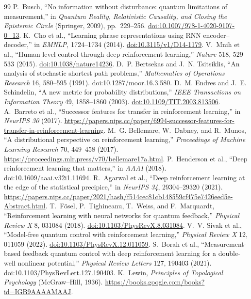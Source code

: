 \documentclass[11pt]{article}
\newcommand{\doi}[1]{\href{https://doi.org/#1}{doi:#1}}
\begin{document}
\begin{thebibliography}{99}
 P.~Busch,
``No information without disturbance: quantum limitations of measurement,''
in \emph{Quantum Reality, Relativistic Causality, and Closing the Epistemic
Circle} (Springer, 2009), pp.~229--256.
\doi{10.1007/978-1-4020-9107-0\_13}.
 K.~Cho et al., “Learning phrase representations using RNN
encoder--decoder,” in \emph{EMNLP}, 1724--1734 (2014).
\doi{10.3115/v1/D14-1179}.
 V.~Mnih et al., “Human-level control through deep
reinforcement learning,” \emph{Nature} 518, 529--533 (2015).
\doi{10.1038/nature14236}.
 D.~P. Bertsekas and J.~N. Tsitsiklis,
“An analysis of stochastic shortest path problems,”
\emph{Mathematics of Operations Research} 16, 580--595 (1991).
\doi{10.1287/moor.16.3.580}.
 D.~M. Endres and J.~E. Schindelin,
“A new metric for probability distributions,”
\emph{IEEE Transactions on Information Theory} 49, 1858--1860 (2003).
\doi{10.1109/TIT.2003.813506}.
 A.~Barreto et al., “Successor features for transfer in
reinforcement learning,” in \emph{NeurIPS 30} (2017).
\url{https://papers.nips.cc/paper/6994-successor-features-for-transfer-in-reinforcement-learning}.
 M.~G. Bellemare, W.~Dabney, and R.~Munos,
“A distributional perspective on reinforcement learning,”
\emph{Proceedings of Machine Learning Research} 70, 449--458 (2017).
\url{https://proceedings.mlr.press/v70/bellemare17a.html}.
 P.~Henderson et al., “Deep reinforcement learning that
matters,” in \emph{AAAI} (2018). \doi{10.1609/aaai.v32i1.11694}.
 R.~Agarwal et al., “Deep reinforcement learning at the
edge of the statistical precipice,” in \emph{NeurIPS 34}, 29304--29320 (2021).
\url{https://papers.nips.cc/paper/2021/hash/f514cec81cb148559cf475e7426eed5e-Abstract.html}.
 T.~F\"osel, P.~Tighineanu, T.~Weiss, and F.~Marquardt,
“Reinforcement learning with neural networks for quantum feedback,”
\emph{Physical Review X} 8, 031084 (2018).
\doi{10.1103/PhysRevX.8.031084}.
 V.~V. Sivak et al., “Model-free quantum control with
reinforcement learning,” \emph{Physical Review X} 12, 011059 (2022).
\doi{10.1103/PhysRevX.12.011059}.
 S.~Borah et al., “Measurement-based feedback quantum
control with deep reinforcement learning for a double-well nonlinear
potential,” \emph{Physical Review Letters} 127, 190403 (2021).
\doi{10.1103/PhysRevLett.127.190403}.
 K.~Lewin, \emph{Principles of Topological Psychology}
(McGraw--Hill, 1936).
\url{https://books.google.com/books?id=IGB9AAAAMAAJ}.

\end{thebibliography}
\end{document}
